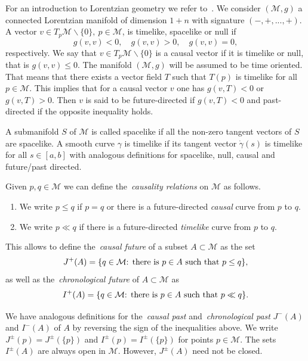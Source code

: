 \documentclass[12pt,reqno]{amsart}
\numberwithin{equation}{section}
\theoremstyle{definition}
\theoremstyle{plain}
\theoremstyle{definition}
\theoremstyle{definition}
\newcommand{\M}{\mathcal{M}}
\begin{document}
For an introduction to Lorentzian geometry we refer to~\cite{oneill1983, ringstrom2009}. We consider $(\M, g)$ a connected Lorentzian manifold of dimension $1+n$ with signature $(-,+,...,+)$. A vector $v \in T_p \M \backslash \{0\}, \: p \in \M$, is timelike, spacelike or null if
\begin{equation}
    g(v,v)<0,\quad g(v,v)>0, \quad g(v,v)=0,
\end{equation}
respectively. We say that $v \in T_p \M \backslash \{0\} $ is a causal vector if it is timelike or null, that is $g(v,v) \leq 0$. The manifold $(\M, g)$ will be assumed to be time oriented. That means that there exists a vector field $T$ such that $T(p)$ is timelike for all $p \in \M$. This implies that for a causal vector $v$ one has $g(v,T)<0$ or $g(v,T)>0$. Then $v$ is said to be future-directed if $g(v,T)<0$ and past-directed if the opposite inequality holds.

 A submanifold $S$ of $\M$ is called spacelike if all the non-zero tangent vectors of $S$ are spacelike. A smooth curve $\gamma$ is timelike if its tangent vector $\dot \gamma(s)$ is timelike for all $s \in [a,b]$ with analogous definitions for spacelike, null, causal and future/past directed.

Given $p,q \in \M$ we can define the~\textit{causality relations} on $\M$ as follows.
\begin{enumerate}
    \item  We write $p \leq q$ if $p=q$ or there is a future-directed \textit{causal} curve from $p$ to $q$.

    \item We write $p \ll q$ if there is a future-directed \textit{timelike} curve from $p$ to $q$.
\end{enumerate}





This allows to define the~\textit{causal future} of a subset $A \subset \M$ as the set
\begin{equation}
    J^+(A)=\{q \in \M \textnormal{: there is $p$} \in A \textnormal{ such that } p\leq q \},
\end{equation}
as well as the~\textit{chronological future} of $A \subset \M$ as
\begin{equation}
    I^+(A)=\{q \in \M \textnormal{: there is $p$} \in A \textnormal{ such that } p\ll q \}.
\end{equation}



 We have analogous definitions for the~\textit{causal past} and~\textit{chronological past} $J^-(A)$ and $I^{-}(A)$ of $A$ by reversing the sign of the inequalities above. We write $J^{\pm}(p)= J^{\pm}(\{p\})$ and $I^{\pm}(p)= I^{\pm}(\{p\})$ for points $p \in \M$. The sets $I^{\pm}(A)$ are always open in $\M$. However, $J^{\pm}(A)$ need not be closed.
\end{document}
